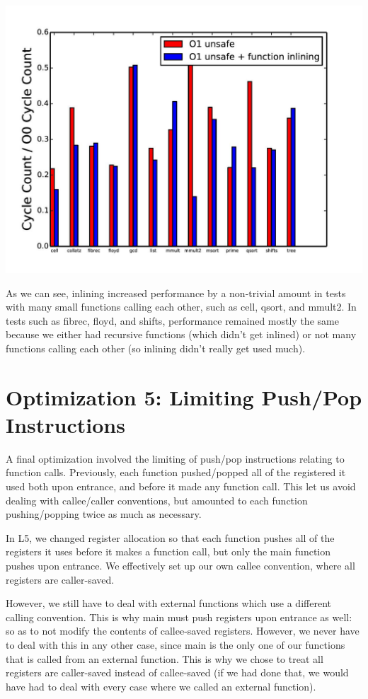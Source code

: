 \documentclass{article}
\begin{document}
\includegraphics[scale=0.5]{O1_vs_inlining-page-001}

As we can see, inlining increased performance by a non-trivial amount in tests with many small functions calling each other, such as cell, qsort, and mmult2. In tests such as fibrec, floyd, and shifts, performance remained mostly the same because we either had recursive functions (which didn't get inlined) or not many functions calling each other (so inlining didn't really get used much). 

\section{Optimization 5: Limiting Push/Pop Instructions}

A final optimization involved the limiting of push/pop instructions relating to function calls. Previously, each function pushed/popped all of the registered it used both upon entrance, and before it made any function call. This let us avoid dealing with callee/caller conventions, but amounted to each function pushing/popping twice as much as necessary.

In L5, we changed register allocation so that each function pushes all of the registers it uses before it makes a function call, but only the main function pushes upon entrance. We effectively set up our own callee convention, where all registers are caller-saved.

However, we still have to deal with external functions which use a different calling convention. This is why main must push registers upon entrance as well: so as to not modify the contents of callee-saved registers. However, we never have to deal with this in any other case, since main is the only one of our functions that is called from an external function. This is why we chose to treat all registers are caller-saved instead of callee-saved (if we had done that, we would have had to deal with every case where we called an external function).
\end{document}
